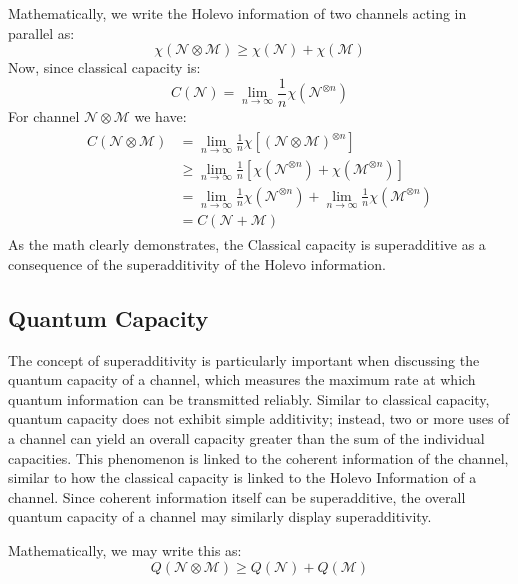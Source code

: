Mathematically, we write the Holevo information of two channels acting in parallel as:
\begin{equation*}
    \chi(\mathcal{N} \otimes \mathcal{M}) \geq \chi(\mathcal{N}) + \chi(\mathcal{M})
\end{equation*}
Now, since classical capacity is:
\begin{equation*}
    C(\mathcal{N}) = \lim_{n \rightarrow \infty }\frac{1}{n}\chi(\mathcal{N}^{\otimes n})
\end{equation*}
For channel $\mathcal{N}\otimes\mathcal{M}$ we have:
\begin{align*}\begin{split}
    C(\mathcal{N}\otimes\mathcal{M}) & = \lim_{n \rightarrow \infty }\frac{1}{n}\chi[(\mathcal{N}\otimes\mathcal{M})^{\otimes n}]\\
    & \geq \lim_{n \rightarrow \infty }\frac{1}{n}[\chi(\mathcal{N}^{\otimes n}) + \chi(\mathcal{M}^{\otimes n})]\\
    & = \lim_{n \rightarrow \infty }\frac{1}{n}\chi(\mathcal{N}^{\otimes n}) + \lim_{n \rightarrow \infty }\frac{1}{n}\chi(\mathcal{M}^{\otimes n})\\
    & = C(\mathcal{N} + \mathcal{M})
\end{split}\end{align*}
As the math clearly demonstrates, the Classical capacity is superadditive as a consequence
of the superadditivity of the Holevo information.

\subsection{Quantum Capacity}
The concept of superadditivity is particularly important when discussing the quantum capacity
of a channel, which measures the maximum rate at which quantum information can be transmitted
reliably. Similar to classical capacity, quantum capacity does not exhibit simple additivity;
instead, two or more uses of a channel can yield an overall capacity greater than the sum of
the individual capacities. This phenomenon is linked to the coherent information of the
channel, similar to how the classical capacity is linked to the Holevo Information of a channel.
Since coherent information itself can be superadditive, the overall quantum capacity of a
channel may similarly display superadditivity.

Mathematically, we may write this as:
\begin{equation*}
    Q(\mathcal{N} \otimes \mathcal{M}) \geq Q(\mathcal{N}) + Q(\mathcal{M})
\end{equation*}

